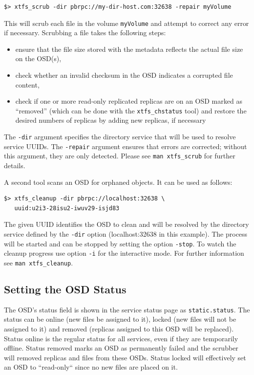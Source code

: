 \documentclass[a4paper,10pt]{book}
\begin{document}
\begin{verbatim}
$> xtfs_scrub -dir pbrpc://my-dir-host.com:32638 -repair myVolume
\end{verbatim}

This will scrub each file in the volume \texttt{myVolume} and attempt to correct any error if necessary. Scrubbing a file takes the following steps:
\begin{itemize}
 \item ensure that the file size stored with the metadata reflects the actual file size on the OSD(s),
 \item check whether an invalid checksum in the OSD indicates a corrupted file content,
 \item check if one or more read-only replicated replicas are on an OSD marked as ``removed'' (which can be done with the \texttt{xtfs\_chstatus} tool) and restore the desired numbers of replicas by adding new replicas, if necessary
\end{itemize}

The \texttt{-dir} argument specifies the directory service that will be used to resolve service UUIDs. The \texttt{-repair} argument ensures that errors are corrected; without this argument, they are only detected. Please see \texttt{man xtfs\_scrub} for further details.

A second tool scans an OSD for orphaned objects. It can be used as follows:

\begin{verbatim}
$> xtfs_cleanup -dir pbrpc://localhost:32638 \
   uuid:u2i3-28isu2-iwuv29-isjd83
\end{verbatim}
The given UUID identifies the OSD to clean and will be resolved by the
directory service defined by the \texttt{-dir} option (localhost:32638 in this example).
The process will be started and can be stopped by setting the option
\texttt{-stop}. To watch the cleanup progress use option \texttt{-i} for the
interactive mode. For further information see \texttt{man xtfs\_cleanup}.

\subsection{Setting the OSD Status}

The OSD's status field is shown in the service status page as \texttt{static.status}. The status can be online (new files be assigned to it), locked (new files will not be assigned to it) and removed (replicas assigned to this OSD will be replaced). Status online is the regular status for all services, even if they are temporarily offline. Status removed marks an OSD as permanently failed and the scrubber will removed replicas and files from these OSDs. Status locked will effectively set an OSD to ``read-only`` since no new files are placed on it.
\end{document}
